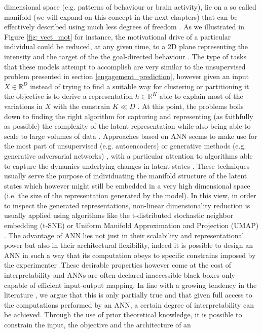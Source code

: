 dimensional space (e.g. patterns of behaviour or brain activity), lie on a so called manifold (we will expand on this concept in the next chapters) that can be effectively described using much less degrees of freedom \cite{seung2000manifold, pang2016dimensionality, luxem2020identifying}. As we illustrated in Figure \ref{fig: vect_mot} for instance, the motivational drive of a particular individual could be reduced, at any given time, to a 2D plane representing the intensity and the target of the the goal-directed behaviour \cite{simpson2016behavioral}. The type of tasks that these models attempt to accomplish are very similar to the unsupervised problem presented in section \ref{engagement_prediction}, however given an input $X \in \mathbb{R}^{D}$ instead of trying to find a suitable way for clustering or partitioning it the objective is to derive a representation $h \in \mathbb{R}^{K}$ able to explain most of the variations in $X$ with the constrain $K \ll D$ \cite{bishop2006pattern,murphy2022probabilistic}. At this point, the problems boils down to finding the right algorithm for capturing and representing (as faithfully as possible) the complexity of the latent representation \cite{eyjolfsdottir2016learning,schuster2007introduction} while also being able to scale to large volumes of data \cite{touloupou2020scalable}. Approaches based on ANN seems to make use for the most part of unsupervised (e.g. autoencoders) \cite{luxem2020identifying, mccullough2021unsupervised} or generative methods (e.g. generative adversarial networks) \cite{eyjolfsdottir2016learning, mccullough2021unsupervised}, with a particular attention to algorithms able to capture the dynamics underlying changes in latent states \cite{eyjolfsdottir2016learning, song2017reward}. These techniques usually serve the purpose of individuating the manifold structure of the latent states \cite{eyjolfsdottir2016learning} which however might still be embedded in a very high dimensional space (i.e. the size of the representation generated by the model). In this view, in order to inspect the generated representations, non-linear dimensionality reduction is usually applied \cite{mccullough2021unsupervised} using algorithms like the t-distributed stochastic neighbor embedding \cite{van2008visualizing} (t-SNE) or Uniform Manifold Approximation and Projection (UMAP) \cite{mcinnes2018umap-software}. The advantage of ANN lies not just in their scalability and representational power but also in their architectural flexibility, indeed it is possible to design an ANN in such a way that its computation obeys to specific constrains imposed by the experimenter \cite{eyjolfsdottir2016learning}.These desirable properties however come at the cost of interpretability and ANNs are often declared inaccessible black boxes only capable of  efficient input-output mapping. In line with a growing tendency in the literature \cite{barak2017recurrent,kietzmann2018deep, luxem2020identifying, pereira2020quantifying, mccullough2021unsupervised, shi2021learning}, we argue that this is only partially true and that given full access to the computations performed by an ANN, a certain degree of interpretability can be achieved. Through the use of prior theoretical knowledge, it is possible to constrain the input, the objective and the architecture of an 